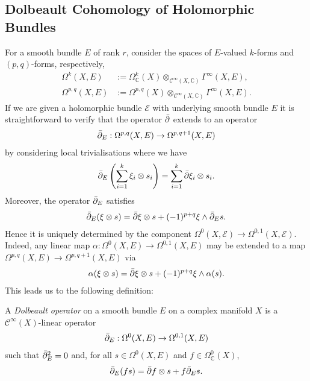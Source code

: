 \documentclass[12pt]{ociamthesis}  %
\begin{document}
\subsection{Dolbeault Cohomology of Holomorphic Bundles}

For a smooth bundle $E$ of rank $r$, consider the spaces of
$E$-valued $k$-forms and $(p,q)$-forms, respectively,
\begin{align*}
  \Omega^k(X,E)     & := \Omega^k_{\mathbb C}(X)\otimes_{\mathscr C^\infty(X,\mathbb C)}\Gamma^\infty(X,E), \\
  \Omega^{p,q}(X,E) & := \Omega^{p,q}(X)\otimes_{\mathscr C^\infty(X,\mathbb C)}\Gamma^\infty(X,E).
\end{align*}
If we are given a holomorphic bundle $\mathcal E$ with underlying
smooth bundle $E$
it is straightforward to verify that the operator ${\bar{\partial}}$ extends
to an operator
\begin{align}\label{eq:general_dolbeault_operator}
  {\bar{\partial}}_E : \Omega^{p,q}(X,E) \to \Omega^{p,q+1}(X,E)
\end{align}
by considering local trivialisations where we have
\begin{align*}
  {\bar{\partial}}_E \left({\sum_{i=1}^k \xi_i \otimes s_i}\right)
  = \sum_{i=1}^k {\bar{\partial}} \xi_i \otimes s_i.
\end{align*}
Moreover, the operator ${\bar{\partial}}_E$ satisfies
\begin{align*}
  {\bar{\partial}}_E(\xi \otimes s) = {\bar{\partial}}\xi \otimes s + (-1)^{p+q} \xi \wedge {\bar{\partial}}_E s.
\end{align*}
Hence it is uniquely determined by the component
$\Omega^0(X,\mathcal E) \to \Omega^{0,1}(X,\mathcal E)$. Indeed,
any linear map $\alpha : \Omega^0(X,E) \to \Omega^{0,1}(X,E)$ may be
extended to a map $\Omega^{p,q}(X,E) \to \Omega^{p,q+1}(X,E)$
via
\begin{align}\label{eq:leibniz_extension}
  \alpha(\xi \otimes s) = {\bar{\partial}}\xi \otimes s + (-1)^{p+q}\xi\wedge \alpha(s).
\end{align}
This leads us to the following definition:

\begin{definition}
  A \emph{Dolbeault operator} on a smooth bundle $E$ on a complex
  manifold $X$ is a $\mathscr C^\infty(X)$-linear operator
  \begin{align*}
    {\bar{\partial}}_E : \Omega^0(X,E) \to \Omega^{0,1}(X,E)
  \end{align*}
  such that ${\bar{\partial}}_E^2 = 0$ and, for all $s\in\Omega^0(X,E)$ and
  $f\in \Omega^0_{\mathbb C}(X)$,
  \begin{align*}
    {\bar{\partial}}_E (fs) = {\bar{\partial}} f\otimes s + f {\bar{\partial}}_E s.
  \end{align*}
\end{definition}
\end{document}
